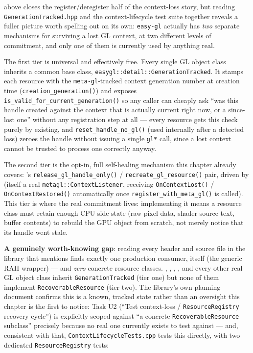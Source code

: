  above closes the register/deregister half of the context-loss
story, but reading \texttt{GenerationTracked.hpp} and the context-lifecycle test suite together
reveals a fuller picture worth spelling out on its own: \texttt{easy-gl} actually has
\emph{two} separate mechanisms for surviving a lost GL context, at two different levels of
commitment, and only one of them is currently used by anything real.

The first tier is universal and effectively free. Every single GL object class inherits a
common base class,
\texttt{easygl::\allowbreak{}detail::\allowbreak{}GenerationTracked}. It stamps each
resource with the \texttt{meta-gl}-tracked context generation number at creation time
(\texttt{creation\_generation()}) and exposes \texttt{is\_valid\_for\_current\_generation()} so
any caller can cheaply ask ``was this handle created against the context that is actually
current right now, or a since-lost one'' without any registration step at all --- every
resource gets this check purely by existing, and \texttt{reset\_handle\_no\_gl()} (used
internally after a detected loss) zeroes the handle without issuing a single \texttt{gl*} call,
since a lost context cannot be trusted to process one correctly anyway.

The second tier is the opt-in, full self-healing mechanism this chapter already covers:
's \texttt{release\_gl\_handle\_only()} / \texttt{recreate\_gl\_resource()}
pair, driven by  (itself a real \texttt{metagl::ContextListener},
receiving \texttt{OnContextLost()} / \texttt{OnContextRestored()} automatically once
\texttt{register\_with\_meta\_gl()} is called). This tier is where the real commitment lives:
implementing it means a resource class must retain enough CPU-side state (raw pixel data, shader
source text, buffer contents) to rebuild the GPU object from scratch, not merely notice that its
handle went stale.

\textbf{A genuinely worth-knowing gap}: reading every header and source file in the library that
mentions  finds exactly one production consumer,
 itself (the generic RAII wrapper) --- and \emph{zero} concrete
resource classes. , , ,
, and every other real GL object class inherit \texttt{GenerationTracked}
(tier one) but none of them implement \texttt{RecoverableResource} (tier two). The library's own
planning document confirms this is a known, tracked state rather than an oversight this chapter
is the first to notice: Task U2 (``Test context-loss / \texttt{ResourceRegistry} recovery
cycle'') is explicitly scoped against ``a concrete \texttt{RecoverableResource} subclass''
precisely because no real one currently exists to test against --- and, consistent with that,
\texttt{ContextLifecycleTests.cpp} tests this directly, with two dedicated
\texttt{ResourceRegistry} tests:


